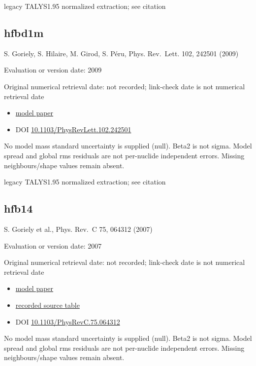 \documentclass[
  11pt,
  letterpaper,
]{article}
\providecommand{\tightlist}{%
  \setlength{\itemsep}{0pt}\setlength{\parskip}{0pt}}
\begin{document}
legacy TALYS1.95 normalized extraction; see citation

\subsection{hfbd1m}\label{hfbd1m}

S. Goriely, S. Hilaire, M. Girod, S. Péru, Phys. Rev.~Lett. 102, 242501
(2009)

Evaluation or version date: 2009

Original numerical retrieval date: not recorded; link-check date is not
numerical retrieval date

\begin{itemize}
\tightlist
\item
  \href{https://doi.org/10.1103/PhysRevLett.102.242501}{model paper}
\item
  DOI
  \href{https://doi.org/10.1103/PhysRevLett.102.242501}{10.1103/PhysRevLett.102.242501}
\end{itemize}

No model mass standard uncertainty is supplied (null). Beta2 is not
sigma. Model spread and global rms residuals are not per-nuclide
independent errors. Missing neighbours/shape values remain absent.

legacy TALYS1.95 normalized extraction; see citation

\subsection{hfb14}\label{hfb14}

S. Goriely et al., Phys. Rev.~C 75, 064312 (2007)

Evaluation or version date: 2007

Original numerical retrieval date: not recorded; link-check date is not
numerical retrieval date

\begin{itemize}
\tightlist
\item
  \href{https://doi.org/10.1103/PhysRevC.75.064312}{model paper}
\item
  \href{https://www.astro.ulb.ac.be/Nucdata/Masses/hfb14-plain}{recorded
  source table}
\item
  DOI
  \href{https://doi.org/10.1103/PhysRevC.75.064312}{10.1103/PhysRevC.75.064312}
\end{itemize}

No model mass standard uncertainty is supplied (null). Beta2 is not
sigma. Model spread and global rms residuals are not per-nuclide
independent errors. Missing neighbours/shape values remain absent.
\end{document}
